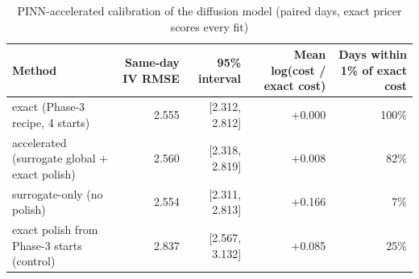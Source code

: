 \begin{table}[ht]
\centering
\small
\caption{PINN-accelerated calibration of the diffusion model (paired days, exact pricer scores every fit)}
\begin{tabular}{lrrrr}
\toprule
Method & Same-day IV RMSE & 95\% interval & Mean log(cost / exact cost) & Days within 1\% of exact cost \\
\midrule
exact (Phase-3 recipe, 4 starts) & 2.555 & [2.312, 2.812] & +0.000 & 100\% \\
accelerated (surrogate global + exact polish) & 2.560 & [2.318, 2.819] & +0.008 & 82\% \\
surrogate-only (no polish) & 2.554 & [2.311, 2.813] & +0.166 & 7\% \\
exact polish from Phase-3 starts (control) & 2.837 & [2.567, 3.132] & +0.085 & 25\% \\
\bottomrule
\end{tabular}
\par{}
\end{table}
